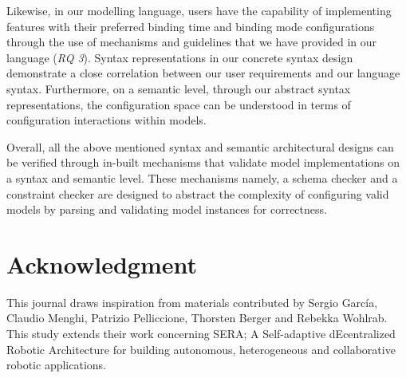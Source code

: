\documentclass[conference]{IEEEtran}
\begin{document}
Likewise, in our modelling language, users have the capability of implementing features with their preferred binding time and binding mode configurations through the use of mechanisms and guidelines that we have provided in our language (\textit{RQ 3}). Syntax representations in our concrete syntax design demonstrate a close correlation between our user requirements and our language syntax. Furthermore, on a semantic level, through our abstract syntax representations, the configuration space can be understood in terms of configuration interactions within models.

Overall, all the above mentioned syntax and semantic architectural designs can be verified through in-built mechanisms that validate model implementations on a syntax and semantic level. These mechanisms namely, a schema checker and a constraint checker are designed to abstract the complexity of configuring valid models by parsing and validating model instances for correctness. 

\section*{Acknowledgment}
This journal draws inspiration from materials contributed by Sergio Garc\'{i}a, Claudio Menghi, Patrizio Pelliccione, Thorsten Berger and Rebekka Wohlrab. This study extends their work concerning SERA; A Self-adaptive dEcentralized Robotic Architecture for building autonomous, heterogeneous and collaborative robotic applications. 
\end{document}

